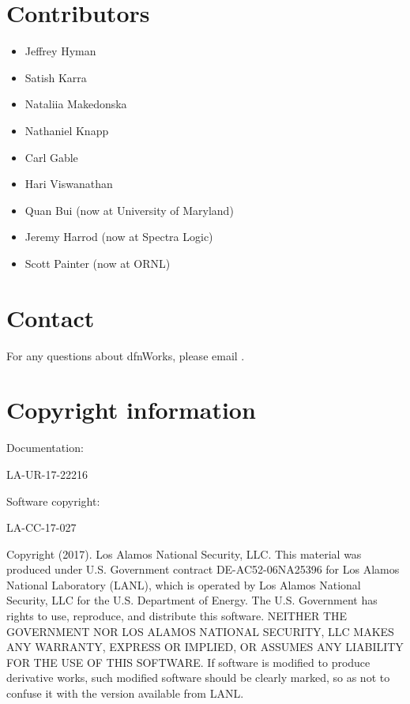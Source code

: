 \documentclass[letterpaper,10pt,english]{sphinxmanual}
\begin{document}
\section{Contributors}
\label{\detokenize{intro:contributors}}\begin{itemize}
\item {} 
Jeffrey Hyman

\item {} 
Satish Karra

\item {} 
Nataliia Makedonska

\item {} 
Nathaniel Knapp

\item {} 
Carl Gable

\item {} 
Hari Viswanathan

\item {} 
Quan Bui (now at University of Maryland)

\item {} 
Jeremy Harrod (now at Spectra Logic)

\item {} 
Scott Painter (now at ORNL)

\end{itemize}


\section{Contact}
\label{\detokenize{intro:contact}}
For any questions about dfnWorks, please email .


\section{Copyright information}
\label{\detokenize{intro:copyright-information}}
Documentation:

LA-UR-17-22216

Software copyright:

LA-CC-17-027

Copyright (2017).  Los Alamos National Security, LLC. This material was
produced under U.S. Government contract DE-AC52-06NA25396 for Los Alamos
National Laboratory (LANL), which is operated by Los Alamos National Security,
LLC for the U.S. Department of Energy. The U.S. Government has rights to use,
reproduce, and distribute this software.  NEITHER THE GOVERNMENT NOR LOS ALAMOS
NATIONAL SECURITY, LLC MAKES ANY WARRANTY, EXPRESS OR IMPLIED, OR ASSUMES ANY
LIABILITY FOR THE USE OF THIS SOFTWARE.  If software is modified to produce
derivative works, such modified software should be clearly marked, so as not
to confuse it with the version available from LANL.
\end{document}
